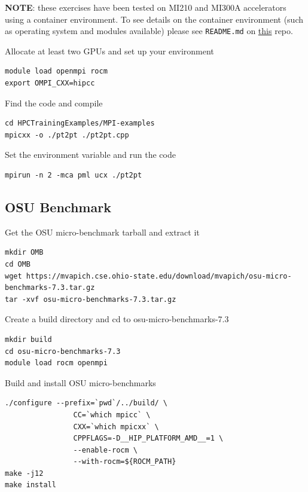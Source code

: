 \documentclass[
]{article}
\let\oldtexttt\texttt
\renewcommand{\texttt}[1]{
  \colorbox{Light}{\oldtexttt{#1}}
}
\begin{document}
\textbf{NOTE}: these exercises have been tested on MI210 and MI300A
accelerators using a container environment. To see details on the
container environment (such as operating system and modules available)
please see \texttt{README.md} on
\href{https://github.com/amd/HPCTrainingDock}{this} repo.

Allocate at least two GPUs and set up your environment

\begin{verbatim}
module load openmpi rocm
export OMPI_CXX=hipcc
\end{verbatim}

Find the code and compile

\begin{verbatim}
cd HPCTrainingExamples/MPI-examples
mpicxx -o ./pt2pt ./pt2pt.cpp
\end{verbatim}

Set the environment variable and run the code

\begin{verbatim}
mpirun -n 2 -mca pml ucx ./pt2pt
\end{verbatim}

\hypertarget{osu-benchmark}{%
\subsection{OSU Benchmark}\label{osu-benchmark}}

Get the OSU micro-benchmark tarball and extract it

\begin{verbatim}
mkdir OMB
cd OMB
wget https://mvapich.cse.ohio-state.edu/download/mvapich/osu-micro-benchmarks-7.3.tar.gz
tar -xvf osu-micro-benchmarks-7.3.tar.gz
\end{verbatim}

Create a build directory and cd to osu-micro-benchmarks-7.3

\begin{verbatim}
mkdir build
cd osu-micro-benchmarks-7.3
module load rocm openmpi
\end{verbatim}

Build and install OSU micro-benchmarks

\begin{verbatim}
./configure --prefix=`pwd`/../build/ \
                CC=`which mpicc` \
                CXX=`which mpicxx` \
                CPPFLAGS=-D__HIP_PLATFORM_AMD__=1 \
                --enable-rocm \
                --with-rocm=${ROCM_PATH}
make -j12
make install
\end{verbatim}
\end{document}

